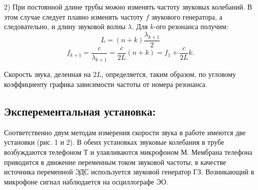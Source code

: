 \documentclass[a4paper,12pt]{article}
\begin{document}
		2) При постоянной длине трубы можно изменять частоту звуковых
		колебаний. В этом случае следует плавно изменять частоту $f$ звукового генератора, а следовательно, и длину звуковой волны $\lambda$.
		Для $k$-ого резонанса получим:
		$$L = (n+k)\frac{\lambda_{k+1}}{2}$$
		$$f_{k+1} = \frac{c}{\lambda_{k+1}}=\frac{c}{2L}(n+k)=f_1 + \frac{c}{2L}k.$$
		
		Скорость звука, деленная на $2L$, определяется, таким образом,
		по угловому коэффициенту графика зависимости частоты от номера
		резонанса.
	\subsection{Эксперементальная установка:}
	\begin{figure}[h]
	\end{figure}
	Соответственно двум методам измерения скорости звука в работе имеются две установки (рис. 1 и 2). В обеих установках звуковые колебания в трубе возбуждаются телефоном Т и улавливаются микрофоном М. Мембрана телефона приводится в движение переменным током звуковой частоты; в качестве источника переменной ЭДС используется звуковой генератор ГЗ. Возникающий в микрофоне сигнал наблюдается на осциллографе ЭО.
\end{document}
